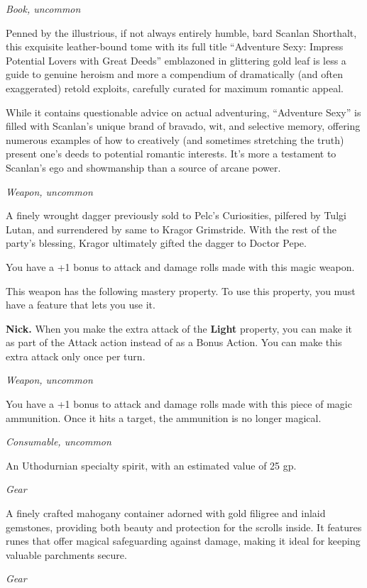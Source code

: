 \documentclass[
  letterpaper,12pt,twoside,twocolumn,openany,
  nodeprecatedcode,bg=full]{dndbook}
\begin{document}
{\emph{Book, uncommon}}

Penned by the illustrious, if not always entirely humble, bard Scanlan
Shorthalt, this exquisite leather-bound tome with its full title
``Adventure Sexy: Impress Potential Lovers with Great Deeds'' emblazoned
in glittering gold leaf is less a guide to genuine heroism and more a
compendium of dramatically (and often exaggerated) retold exploits,
carefully curated for maximum romantic appeal.

While it contains questionable advice on actual adventuring, ``Adventure
Sexy'' is filled with Scanlan's unique brand of bravado, wit, and
selective memory, offering numerous examples of how to creatively (and
sometimes stretching the truth) present one's deeds to potential
romantic interests. It's more a testament to Scanlan's ego and
showmanship than a source of arcane power.

{\emph{Weapon, uncommon}}

A finely wrought dagger previously sold to Pelc's Curiosities, pilfered
by Tulgi Lutan, and surrendered by same to Kragor Grimstride. With the
rest of the party's blessing, Kragor ultimately gifted the dagger to
Doctor Pepe.

You have a +1 bonus to attack and damage rolls made with this magic
weapon.

This weapon has the following mastery property. To use this property,
you must have a feature that lets you use it.

\textbf{Nick.} When you make the extra attack of the \textbf{Light}
property, you can make it as part of the Attack action instead of as a
Bonus Action. You can make this extra attack only once per turn.

{\emph{Weapon, uncommon}}

You have a +1 bonus to attack and damage rolls made with this piece of
magic ammunition. Once it hits a target, the ammunition is no longer
magical.

{\emph{Consumable, uncommon}}

An Uthodurnian specialty spirit, with an estimated value of 25 gp.

{\emph{Gear}}

A finely crafted mahogany container adorned with gold filigree and
inlaid gemstones, providing both beauty and protection for the scrolls
inside. It features runes that offer magical safeguarding against
damage, making it ideal for keeping valuable parchments secure.

{\emph{Gear}}
\end{document}
